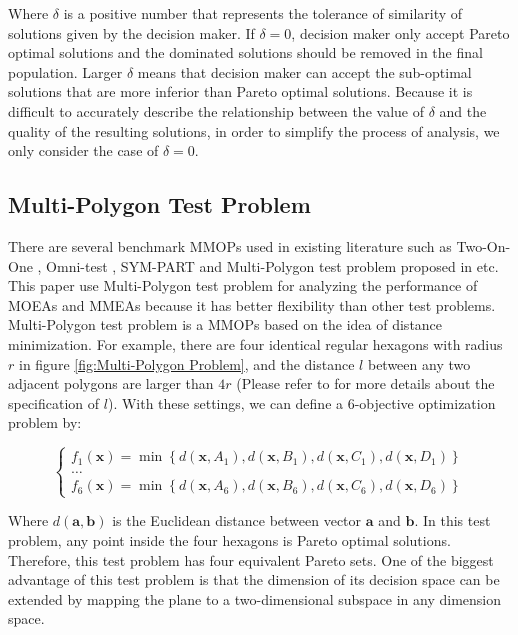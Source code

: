 \documentclass[conference]{IEEEtran}
\begin{document}
Where $\delta$ is a positive number that represents the tolerance of similarity of solutions given by the decision maker. If $\delta = 0$, decision maker only accept Pareto optimal solutions and the dominated solutions should be removed in the final population.  Larger $\delta$ means that decision maker can accept the sub-optimal solutions that are more inferior than Pareto optimal solutions. Because it is difficult to accurately describe the relationship between the value of $\delta$ and the quality of the resulting solutions, in order to simplify the process of analysis, we only consider the case of $\delta =0$. 

\subsection{Multi-Polygon Test Problem}
There are several benchmark MMOPs used in existing literature such as Two-On-One \cite{Preuss2006}, Omni-test \cite{Deb2005} , SYM-PART \cite{Rudolph2007a} and Multi-Polygon test problem proposed in \cite{Hisao} etc. This paper use Multi-Polygon test problem for analyzing the performance of MOEAs and MMEAs because it has better flexibility than other test problems.  Multi-Polygon test problem is a MMOPs based on the idea of distance minimization. For example, there are four identical regular hexagons with radius $r$ in figure \ref{fig:Multi-Polygon Problem}, and the distance $l$ between any two adjacent polygons are larger than $4r$ (Please refer to \cite{Hisao} for more details about the specification of $l$). With these settings, we can define a 6-objective optimization problem by:

\begin{equation*}
\left\{
\begin{array}{c}{f_{1}(\boldsymbol{x})=\min \left\{d\left(\boldsymbol{x}, A_{1}\right), d\left(\boldsymbol{x}, B_{1}\right), d\left(\boldsymbol{x}, C_{1}\right), d\left(\boldsymbol{x}, D_{1}\right)\right\}} \\ \dots \\ {{f_{6}}(\boldsymbol{x})=\min \left\{d\left(\boldsymbol{x}, A_{6}\right), d\left(\boldsymbol{x}, B_{6}\right), d\left(\boldsymbol{x}, C_{6}\right), d\left(\boldsymbol{x}, D_{6}\right)\right\}}\end{array}
\right.
\end{equation*}

Where $d(\boldsymbol{a} ,\boldsymbol{b})$ is the Euclidean distance between vector $\boldsymbol{a}$ and $\boldsymbol{b}$.  In this test problem, any point inside the four hexagons is Pareto optimal solutions. Therefore, this test problem has four equivalent Pareto sets. One of the biggest advantage of this test problem is that the dimension of its decision space can be extended by mapping the plane to a two-dimensional subspace in any dimension space. 
\end{document}

